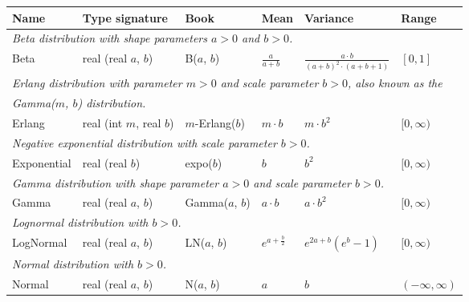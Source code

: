 \begin{table}[t]
  \begin{center}
  \begin{tabular}{|l l l l l l|} \hline
    \textbf{Name} & \textbf{Type signature} & \textbf{Book} & \textbf{Mean} &
        \textbf{Variance} & \textbf{Range} \\

    \hline
    \multicolumn{6}{|l|}{\emph{Beta distribution with shape parameters $a>0$
                               and $b>0$.}} \\
    Beta &
    real (real $a$, $b$) &
    B($a$, $b$) &
    $\frac{a}{a+b}$ &
    $\frac{a\cdot{}b}{(a+b)^2\cdot(a+b+1)}$ &
    $[0,1]$ \\[2pt]

    \hline
    \multicolumn{6}{|l|}{\emph{Erlang distribution with parameter $m>0$ and
                               scale parameter $b>0$, also known as the}} \\
    \multicolumn{6}{|l|}{\emph{Gamma($m$, $b$) distribution.}} \\
    Erlang &
    real (int $m$, real $b$) &
    $m$-Erlang($b$) &
    $m\cdot{}b$ &
    $m\cdot{}b^2$ &
    $[0,\infty)$ \\[2pt]

    \hline
    \multicolumn{6}{|l|}{\emph{Negative exponential distribution with scale
                               parameter $b>0$.}} \\
    Exponential &
    real (real $b$) &
    expo($b$) &
    $b$ &
    $b^2$ &
    $[0,\infty)$ \\[2pt]

    \hline
    \multicolumn{6}{|l|}{\emph{Gamma distribution with shape parameter $a>0$
                               and scale parameter $b>0$.}} \\
    Gamma &
    real (real $a$, $b$) &
    Gamma($a$, $b$) &
    $a\cdot{}b$ &
    $a\cdot{}b^2$ &
    $[0,\infty)$ \\[2pt]

    \hline
    \multicolumn{6}{|l|}{\emph{Lognormal distribution with $b>0$.}} \\
    LogNormal &
    real (real $a$, $b$) &
    LN($a$, $b$) &
    $e^{a+\frac{b}{2}}$ &
    $e^{2a+b}(e^b-1)$ &
    $[0,\infty)$ \\[2pt]

    \hline
    \multicolumn{6}{|l|}{\emph{Normal distribution with $b>0$.}} \\
    Normal &
    real (real $a$, $b$) &
    N($a$, $b$) &
    $a$ &
    $b$ &
    $(-\infty,\infty)$ \\[2pt]


\end{tabular}
\end{center}
\end{table}
